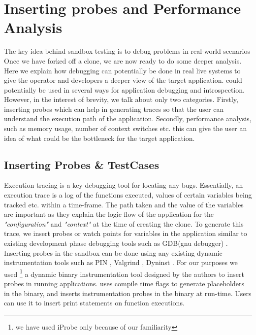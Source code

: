 \section{Inserting probes and Performance Analysis}
\label{sec:trigger}

The key idea behind sandbox testing is to debug problems in real-world scenarios
Once we have forked off a clone, we are now ready to do some deeper analysis. 
Here we explain how debugging can potentially be done in real live systems to give the operator and developers a deeper view of the target application.
\parikshan could potentially be used in several ways for application debugging and introspection. 
However, in the interest of brevity, we talk about only two categories. 
Firstly, inserting probes which can help in generating traces so that the user can understand the execution path of the application.
Secondly, performance analysis, such as memory usage, number of context switches etc. this can give the user an idea of what could be the bottleneck for the target application.


\subsection{Inserting Probes \& TestCases}
\label{sec:unitTests}

Execution tracing is a key debugging tool for locating any bugs. 
Essentially, an execution trace is a log of the functions executed, values of certain variables being tracked etc. within a time-frame.
The path taken and the value of the variables are important as they explain the logic flow of the application for the \emph{"configuration"} and \emph{"context"} at the time of creating the clone.
To generate this trace, we insert probes or watch points for variables in the application similar to existing development phase debugging tools such as GDB(gnu debugger) \cite{gdb}.
Inserting probes in the sandbox can be done using any existing dynamic instrumentation tools  such as PIN \cite{pin}, Valgrind \cite{valgrind}, Dyninst \cite{dyninst}.
For our purposes we used \iprobe\footnote{we have used iProbe only because of our familiarity} \cite{iProbe} a dynamic binary instrumentation tool designed by the authors to insert probes in running applications. 
 \iprobe  uses compile time flags to generate placeholders in the binary, and inserts instrumentation probes in the binary at run-time.
Users can use it to insert print statements on function executions. 



